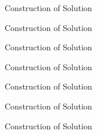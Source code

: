 \begin{frame}{Construction of Solution}
\begin{figure}
\centering

\end{figure}
\end{frame}

\begin{frame}{Construction of Solution}
\begin{figure}
\centering

\end{figure}
\end{frame}

\begin{frame}{Construction of Solution}
\begin{figure}
\centering

\end{figure}
\end{frame}

\begin{frame}{Construction of Solution}
\begin{figure}
\centering

\end{figure}
\end{frame}

\begin{frame}{Construction of Solution}
\begin{figure}
\centering

\end{figure}
\end{frame}

\begin{frame}{Construction of Solution}
\begin{figure}
\centering

\end{figure}
\end{frame}

\begin{frame}{Construction of Solution}
\begin{figure}
\centering

\end{figure}
\end{frame}

